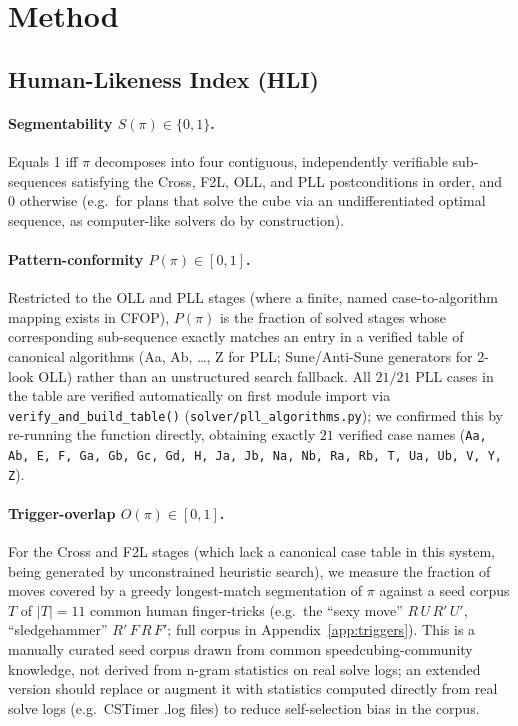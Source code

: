 \documentclass[10pt,conference]{article}
\begin{document}
\section{Method}
\label{sec:method}

\subsection{Human-Likeness Index (HLI)}

\paragraph{Segmentability $S(\pi) \in \{0,1\}$.}
Equals 1 iff $\pi$ decomposes into four contiguous, independently
verifiable sub-sequences satisfying the Cross, F2L, OLL, and PLL
postconditions in order, and 0 otherwise (e.g.\ for plans that solve
the cube via an undifferentiated optimal sequence, as computer-like
solvers do by construction).

\paragraph{Pattern-conformity $P(\pi) \in [0,1]$.}
\label{sec:hli-conformity}
Restricted to the OLL and PLL stages (where a finite, named
case-to-algorithm mapping exists in CFOP), $P(\pi)$ is the fraction
of solved stages whose corresponding sub-sequence exactly matches an
entry in a verified table of canonical algorithms (Aa, Ab, \ldots,
Z for PLL; Sune/Anti-Sune generators for 2-look OLL) rather than an
unstructured search fallback. All $21/21$ PLL cases in the table are
verified automatically on first module import via
\texttt{verify\_and\_build\_table()}
(\texttt{solver/pll\_algorithms.py}); we confirmed this by re-running
the function directly, obtaining exactly $21$ verified case names
(\texttt{Aa, Ab, E, F, Ga, Gb, Gc, Gd, H, Ja, Jb, Na, Nb, Ra, Rb, T, Ua,
Ub, V, Y, Z}).

\paragraph{Trigger-overlap $O(\pi) \in [0,1]$.}
\label{sec:hli-trigger}
For the Cross and F2L stages (which lack a canonical case table in
this system, being generated by unconstrained heuristic search), we
measure the fraction of moves covered by a greedy longest-match
segmentation of $\pi$ against a seed corpus $T$ of $|T|=11$ common
human finger-tricks (e.g.\ the ``sexy move'' $R\,U\,R'\,U'$,
``sledgehammer'' $R'\,F\,R\,F'$; full corpus in
Appendix~\ref{app:triggers}). This is a manually curated seed corpus
drawn from common speedcubing-community knowledge, not derived from
n-gram statistics on real solve logs; an extended version should
replace or augment it with statistics computed directly from real
solve logs (e.g.\ CSTimer .log files) to reduce self-selection bias in
the corpus.
\end{document}
